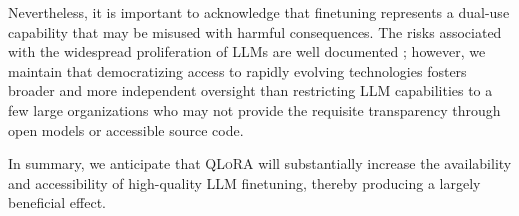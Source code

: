 Nevertheless, it is important to acknowledge that finetuning represents a dual-use capability that may be misused with harmful consequences. The risks associated with the widespread proliferation of LLMs are well documented \citep{bommasani2021opportunities,bender2021dangers}; however, we maintain that democratizing access to rapidly evolving technologies fosters broader and more independent oversight than restricting LLM capabilities to a few large organizations who may not provide the requisite transparency through open models or accessible source code.

In summary, we anticipate that \textsc{QLoRA} will substantially increase the availability and accessibility of high-quality LLM finetuning, thereby producing a largely beneficial effect.